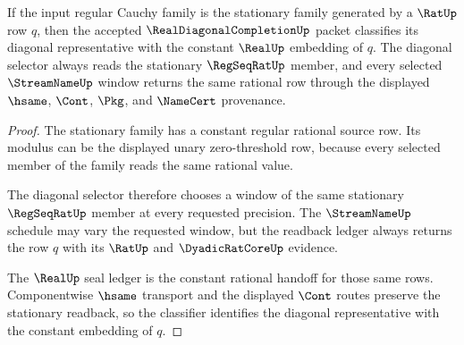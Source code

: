 \begin{theorem}
\label{thm:real-diagonal-completion-constant-rational-handoff}
If the input regular Cauchy family is the stationary family generated by a $\RatUp$ row $q$, then the accepted $\RealDiagonalCompletionUp$ packet classifies its diagonal representative with the constant $\RealUp$ embedding of $q$. The diagonal selector always reads the stationary $\RegSeqRatUp$ member, and every selected $\StreamNameUp$ window returns the same rational row through the displayed $\hsame$, $\Cont$, $\Pkg$, and $\NameCert$ provenance.
\end{theorem}
\begin{proof}
The stationary family has a constant regular rational source row. Its modulus can be the displayed unary zero-threshold row, because every selected member of the family reads the same rational value.

The diagonal selector therefore chooses a window of the same stationary $\RegSeqRatUp$ member at every requested precision. The $\StreamNameUp$ schedule may vary the requested window, but the readback ledger always returns the row $q$ with its $\RatUp$ and $\DyadicRatCoreUp$ evidence.

The $\RealUp$ seal ledger is the constant rational handoff for those same rows. Componentwise $\hsame$ transport and the displayed $\Cont$ routes preserve the stationary readback, so the classifier identifies the diagonal representative with the constant embedding of $q$.
\end{proof}

